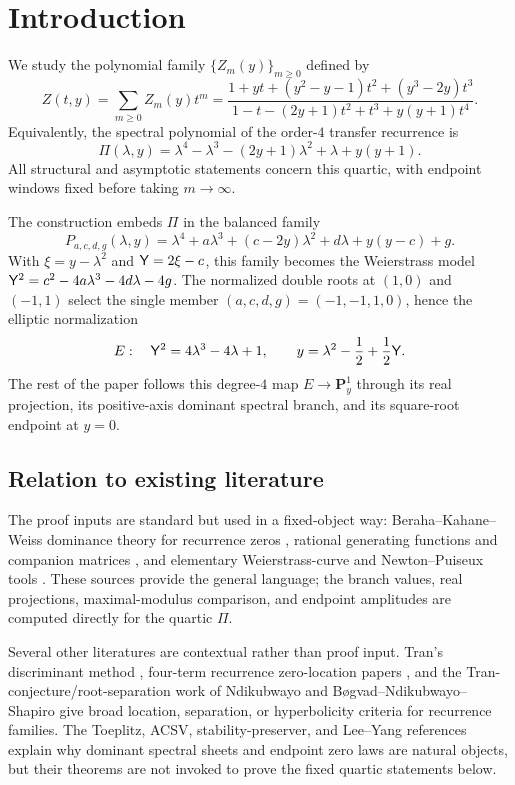 \section{Introduction}

We study the polynomial family $\{Z_m(y)\}_{m\ge0}$ defined by
\[
Z(t,y)=\sum_{m\ge0}Z_m(y)t^m=
\frac{1+yt+(y^2-y-1)t^2+(y^3-2y)t^3}
{1-t-(2y+1)t^2+t^3+y(y+1)t^4}.
\]
Equivalently, the spectral polynomial of the order-$4$ transfer recurrence is
\[
\Pi(\lambda,y)=\lambda^4-\lambda^3-(2y+1)\lambda^2+\lambda+y(y+1).
\]
All structural and asymptotic statements concern this quartic, with endpoint windows fixed before taking $m\to\infty$.

The construction embeds $\Pi$ in the balanced family
\[
P_{a,c,d,g}(\lambda,y)=\lambda^4+a\lambda^3+(c-2y)\lambda^2+d\lambda+y(y-c)+g.
\]
With $\xi=y-\lambda^2$ and $\mathsf{Y}=2\xi-c$, this family becomes the Weierstrass model
$\mathsf{Y}^2=c^2-4a\lambda^3-4d\lambda-4g$.
The normalized double roots at $(1,0)$ and $(-1,1)$ select the single member
$(a,c,d,g)=(-1,-1,1,0)$, hence the elliptic normalization
\[
E:\quad \mathsf{Y}^2=4\lambda^3-4\lambda+1,
\qquad
 y=\lambda^2-\frac12+\frac12\mathsf{Y}.
\]
The rest of the paper follows this degree-$4$ map $E\to\mathbf P^1_y$ through its real projection, its positive-axis dominant spectral branch, and its square-root endpoint at $y=0$.

\subsection{Relation to existing literature}

The proof inputs are standard but used in a fixed-object way: Beraha--Kahane--Weiss dominance theory for recurrence zeros \cite{BerahaKahaneWeiss1975,BerahaKahaneWeiss1978,Sokal2004,BrownOtto2025}, rational generating functions and companion matrices \cite{FlajoletSedgewick2009,Stanley2012,Partington1989,HornJohnson2012}, and elementary Weierstrass-curve and Newton--Puiseux tools \cite{Miranda1995,Silverman2009,Walker1950,BrieskornKnorrer1986}.  These sources provide the general language; the branch values, real projections, maximal-modulus comparison, and endpoint amplitudes are computed directly for the quartic \(\Pi\).

Several other literatures are contextual rather than proof input.  Tran's discriminant method \cite{Tran2014,Tran2015}, four-term recurrence zero-location papers \cite{deBruin1984,ForgacsTran2016,ForgacsTran2017,ForgacsTran2020,TranZumba2018,TranZumba2021,Adams2020,BottaFornazieri2023}, and the Tran-conjecture/root-separation work of Ndikubwayo and B{\o}gvad--Ndikubwayo--Shapiro \cite{Ndikubwayo2020,BogvadNdikubwayoShapiro2020} give broad location, separation, or hyperbolicity criteria for recurrence families.  The Toeplitz, ACSV, stability-preserver, and Lee--Yang references \cite{SchmidtSpitzer1960,Hirschman1967,BottcherGrudsky2005,DuitsKuijlaars2012,PemantleWilson2013,BorceaBranden2009,YangLee1952I,LeeYang1952II,Fisher1978,KortmanGriffiths1971} explain why dominant spectral sheets and endpoint zero laws are natural objects, but their theorems are not invoked to prove the fixed quartic statements below.

